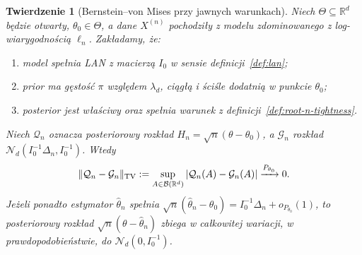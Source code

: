 \documentclass[11pt,a4paper,oneside]{report}
\numberwithin{equation}{chapter}
\theoremstyle{plain}
\newtheorem{twierdzenie}{Twierdzenie}[chapter]
\theoremstyle{definition}
\theoremstyle{remark}
\newcommand{\R}{\mathbb R}
\newcommand{\calB}{\mathcal B}
\newcommand{\norm}[1]{\lVert#1\rVert}
\newcommand{\Normal}{\mathcal N}
\begin{document}
\begin{twierdzenie}[Bernstein--von Mises przy jawnych warunkach]
\label{thm:bvm-under-lan}
Niech $\Theta\subseteq\R^d$ będzie otwarty,
$\theta_0\in\Theta$, a dane $X^{(n)}$ pochodziły z
modelu zdominowanego z log-wiarygodnością $\ell_n$.
Zakładamy, że:
\begin{enumerate}
\item model spełnia LAN z macierzą $I_0$ w sensie
definicji~\ref{def:lan};
\item prior ma gęstość $\pi$ względem $\lambda_d$,
ciągłą i ściśle dodatnią w punkcie $\theta_0$;
\item posterior jest właściwy oraz spełnia warunek
z definicji~\ref{def:root-n-tightness}.
\end{enumerate}
Niech $\mathcal Q_n$ oznacza posteriorowy rozkład
$H_n=\sqrt n(\theta-\theta_0)$, a $\mathcal G_n$
rozkład $\Normal_d(I_0^{-1}\Delta_n,I_0^{-1})$.
Wtedy
\[
 \norm{\mathcal Q_n-\mathcal G_n}_{\rm TV}
 :=\sup_{A\in\calB(\R^d)}|\mathcal Q_n(A)-\mathcal G_n(A)|
 \xrightarrow{P_{\theta_0}}0.
\]
Jeżeli ponadto estymator $\widehat\theta_n$ spełnia
$\sqrt n(\widehat\theta_n-\theta_0)=I_0^{-1}\Delta_n+o_{P_{\theta_0}}(1)$,
to posteriorowy rozkład
$\sqrt n(\theta-\widehat\theta_n)$ zbiega w całkowitej
wariacji, w prawdopodobieństwie, do $\Normal_d(0,I_0^{-1})$.
\end{twierdzenie}
\end{document}
